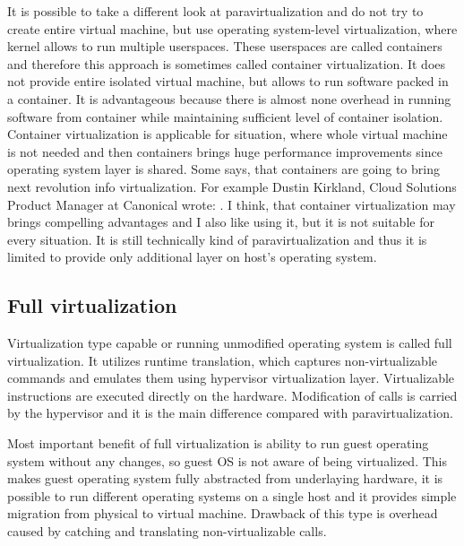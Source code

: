 It is possible to take a different look at paravirtualization and do not try to create entire virtual machine, but use operating system-level virtualization, where kernel allows to run multiple userspaces. These userspaces are called containers and therefore this approach is sometimes called container virtualization. It does not provide entire isolated virtual machine, but allows to run software packed in a container. It is advantageous because there is almost none overhead in running software from container while maintaining sufficient level of container isolation. Container virtualization is applicable for situation, where whole virtual machine is not needed and then containers brings huge performance improvements since operating system layer is shared. Some says, that containers are going to bring next revolution info virtualization. For example Dustin Kirkland, Cloud Solutions Product Manager at Canonical wrote:  \cite{ubuntu-docker}. I think, that container virtualization may brings compelling advantages and I also like using it, but it is not suitable for every situation. It is still technically kind of paravirtualization and thus it is limited to provide only additional layer on host's operating system.

\subsection{Full virtualization}
Virtualization type capable or running unmodified operating system is called full virtualization. It utilizes runtime translation, which captures non-virtualizable commands and emulates them using hypervisor virtualization layer. Virtualizable instructions are executed directly on the hardware. Modification of  calls is carried by the hypervisor and it is the main difference compared with paravirtualization. 

Most important benefit of full virtualization is ability to run guest operating system without any changes, so guest \Ac{OS} is not aware of being virtualized. This makes guest operating system fully abstracted from underlaying hardware, it is possible to run different operating systems on a single host and it provides simple migration from physical to virtual machine. Drawback of this type is overhead caused by catching and translating non-virtualizable calls. 

